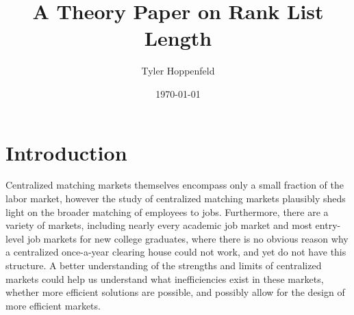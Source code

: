 \documentclass[WP]{AEA}
\begin{document}
\title{A Theory Paper on Rank List Length}
\author{Tyler Hoppenfeld}
\date{\today}
\JEL{}
\Keywords{}



\maketitle


\section{Introduction}

Centralized matching markets themselves encompass only a small fraction of the labor market, however the study of centralized matching markets plausibly sheds light on the broader matching of employees to jobs. Furthermore, there are a variety of markets, including nearly every academic job market and most entry-level job markets for new college graduates, where there is no obvious reason why a centralized once-a-year clearing house could not work, and yet do not have this structure. A better understanding of the strengths and limits of centralized markets could help us understand what inefficiencies exist in these markets, whether more efficient solutions are possible, and possibly allow for the design of more efficient markets. 
\end{document}
